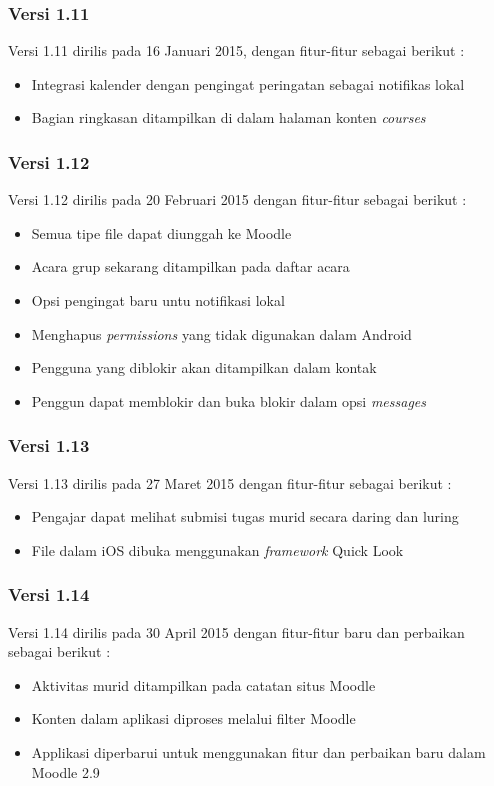 \subsubsection{Versi 1.11}
Versi 1.11 dirilis pada 16 Januari 2015, dengan fitur-fitur sebagai berikut : \cite{Moodlemobile:version1:intro}
	\begin{itemize}
		\item Integrasi kalender dengan pengingat peringatan sebagai notifikas lokal
		\item Bagian ringkasan ditampilkan di dalam halaman konten \textit{courses}
	\end{itemize}

\subsubsection{Versi 1.12}
Versi 1.12 dirilis pada 20 Februari 2015 dengan fitur-fitur sebagai berikut : \cite{Moodlemobile:version1:intro}
	\begin{itemize}
		\item Semua tipe file dapat diunggah ke Moodle
		\item Acara grup sekarang ditampilkan pada daftar acara
		\item Opsi pengingat baru untu notifikasi lokal
		\item Menghapus \textit{permissions} yang tidak digunakan dalam Android
		\item Pengguna yang diblokir akan ditampilkan dalam kontak	
		\item Penggun dapat memblokir dan buka blokir dalam opsi \textit{messages}
	\end{itemize}

\subsubsection{Versi 1.13}
Versi 1.13 dirilis pada 27 Maret 2015 dengan fitur-fitur sebagai berikut : \cite{Moodlemobile:version1:intro}
	\begin{itemize}
		\item Pengajar dapat melihat submisi tugas murid secara daring dan luring
		\item File dalam iOS dibuka menggunakan \textit{framework} Quick Look
	\end{itemize}

\subsubsection{Versi 1.14}
Versi 1.14 dirilis pada 30 April 2015 dengan fitur-fitur baru dan perbaikan sebagai berikut : \cite{Moodlemobile:version1:intro}
	\begin{itemize}
		\item Aktivitas murid ditampilkan pada catatan situs Moodle
		\item Konten dalam aplikasi diproses melalui filter Moodle
		\item Applikasi diperbarui untuk menggunakan fitur dan perbaikan baru dalam Moodle 2.9 
	\end{itemize}

